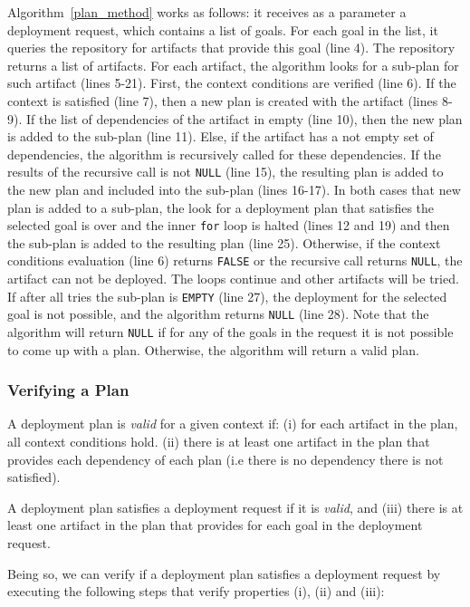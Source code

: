 Algorithm~\ref{plan_method} works as follows: it receives as a parameter a deployment request, which contains a list of goals. For each goal in the list, it queries the repository for artifacts that provide this goal (line 4). The repository returns a list of artifacts. For each artifact, the algorithm looks for a sub-plan for such artifact (lines 5-21). First, the context conditions are verified (line 6). If the context is satisfied (line 7),
then a new plan is created with the artifact (lines 8-9). If the list of dependencies of the artifact in empty (line 10), then the new plan is added to the sub-plan (line 11). Else, if the artifact has a not empty set of dependencies, the algorithm is recursively called for these dependencies. If the results of the recursive call is not \texttt{NULL} (line 15), the resulting plan is added to the new plan and included into the sub-plan (lines 16-17).
In both cases that new plan is added to a sub-plan, the look for a deployment plan that satisfies the selected goal is over and the inner \texttt{for} loop is halted (lines 12 and 19) and then the sub-plan is added to the resulting plan (line 25).
Otherwise, if the context conditions evaluation (line 6) returns \texttt{FALSE} or the recursive call returns \texttt{NULL}, the artifact can not be deployed. The loops continue and other artifacts will be tried. If after all tries the sub-plan is \texttt{EMPTY} (line 27), the deployment for the selected goal is not possible, and the algorithm returns \texttt{NULL} (line 28). Note that the algorithm will return \texttt{NULL} if for any of the goals in the request it is not possible to come up with a plan. Otherwise, the algorithm will return a valid plan.

\subsubsection{Verifying a Plan}
\label{verify_plan}

A deployment plan is \emph{valid} for a given context if: (i) for each artifact in the plan, all context conditions hold.
(ii) there is at least one artifact in the plan that provides each dependency of each plan (i.e there is no dependency there is not satisfied).

A deployment plan satisfies a deployment request if it is \emph{valid}, and (iii) there is at least one artifact in the plan that provides for each goal in the deployment request.

Being so, we can verify if a deployment plan satisfies a deployment request by executing the following steps that verify properties (i), (ii) and (iii):

